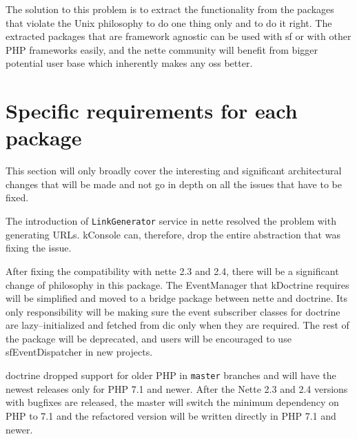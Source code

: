 The solution to this problem is to extract the functionality from the packages that violate the Unix philosophy to do one thing only and to do it right. The extracted packages that are framework agnostic can be used with \gls{sf} or with other PHP frameworks easily, and the \gls{nette} community will benefit from bigger potential user base which inherently makes any \gls{oss} better.

\section{Specific requirements for each package} \label{sec:roadmap:each-package}

This section will only broadly cover the interesting and significant architectural changes that will be made and not go in depth on all the issues that have to be fixed.


The introduction of \lstinline{LinkGenerator} service in \gls{nette} resolved the problem with generating URLs. \gls{kConsole} can, therefore, drop the entire abstraction that was fixing the issue.


After fixing the compatibility with \gls{nette} 2.3 and 2.4, there will be a significant change of philosophy in this package. The EventManager that \gls{kDoctrine} requires will be simplified and moved to a bridge package between \gls{nette} and \gls{doctrine}. Its only responsibility will be making sure the event subscriber classes for \gls{doctrine} are lazy--initialized and fetched from \gls{dic} only when they are required. The rest of the package will be deprecated, and users will be encouraged to use \gls{sfEventDispatcher} in new projects.




\gls{doctrine} dropped support for older PHP in \lstinline{master} branches and will have the newest releases only for PHP 7.1 and newer. After the Nette 2.3 and 2.4 versions with bugfixes are released, the master will switch the minimum dependency on PHP to 7.1 and the refactored version will be written directly in PHP 7.1 and newer.

